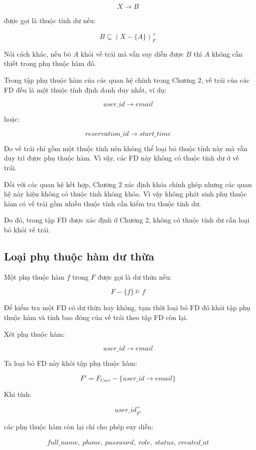 \[
X \rightarrow B
\]

được gọi là thuộc tính dư nếu:

\[
B \subseteq (X-\{A\})^+_F
\]

Nói cách khác, nếu bỏ $A$ khỏi vế trái mà vẫn suy diễn được $B$ thì $A$
không cần thiết trong phụ thuộc hàm đó.

Trong tập phụ thuộc hàm của các quan hệ chính trong Chương 2, vế trái của
các FD đều là một thuộc tính định danh duy nhất, ví dụ:

\[
user\_id \rightarrow email
\]

hoặc:

\[
reservation\_id \rightarrow start\_time
\]

Do vế trái chỉ gồm một thuộc tính nên không thể loại bỏ thuộc tính này mà
vẫn duy trì được phụ thuộc hàm. Vì vậy, các FD này không có thuộc tính dư ở
vế trái.

Đối với các quan hệ kết hợp, Chương 2 xác định khóa chính ghép nhưng các
quan hệ này hiện không có thuộc tính không khóa. Vì vậy không phát sinh
phụ thuộc hàm có vế trái gồm nhiều thuộc tính cần kiểm tra thuộc tính dư.

Do đó, trong tập FD được xác định ở Chương 2, không có thuộc tính dư cần
loại bỏ khỏi vế trái.

\subsection{Loại phụ thuộc hàm dư thừa}

Một phụ thuộc hàm $f$ trong $F$ được gọi là dư thừa nếu:

\[
F-\{f\}\models f
\]

Để kiểm tra một FD có dư thừa hay không, tạm thời loại bỏ FD đó khỏi tập
phụ thuộc hàm và tính bao đóng của vế trái theo tập FD còn lại.

Xét phụ thuộc hàm:

\[
user\_id \rightarrow email
\]

Ta loại bỏ FD này khỏi tập phụ thuộc hàm:

\[
F' = F_{User}-\{user\_id\rightarrow email\}
\]

Khi tính:

\[
user\_id^+_{F'}
\]

các phụ thuộc hàm còn lại chỉ cho phép suy diễn:

\[
\begin{aligned}
	full\_name,\ phone,\ password,\ role,\ status,\ created\_at
\end{aligned}
\]

